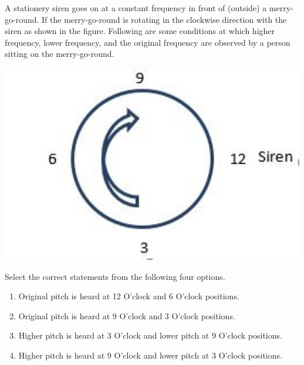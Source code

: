 {\ifEstStatement
A stationery siren goes on at a constant frequency in front of (outside) a merry-go-round. If the merry-go-round is rotating in the clockwise direction with the siren as shown in the figure. Following are some conditions at which higher frequency, lower frequency, and the original frequency are observed by a person sitting on the merry-go-round.
\begin{center}
  \includegraphics[width=0.4\linewidth]{2021-mcq-01-p}
\end{center}
Select the correct statements from the following four options.
\begin{enumerate}
  \item Original pitch is heard at 12 O’clock and 6 O’clock positions.
  \item Original pitch is heard at 9 O’clock and 3 O’clock positions.
  \item Higher pitch is heard at 3 O’clock and lower pitch at 9 O’clock positions.
  \item Higher pitch is heard at 9 O’clock and lower pitch at 3 O’clock positions.
\end{enumerate}

\fi



\fi



\fi



\fi



\fi


\ifEstHint

\fi


\ifEstSolution

\fi
}
